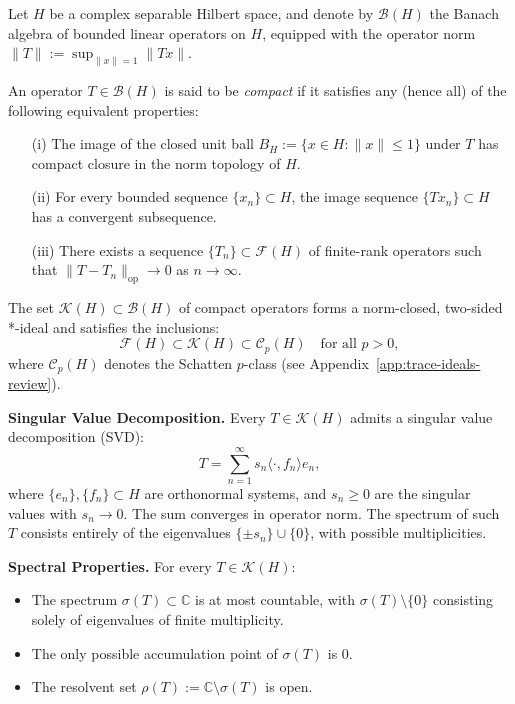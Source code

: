 \begin{definition}\label{def:compact-operator}
Let \( H \) be a complex separable Hilbert space, and denote by \( \mathcal{B}(H) \) the Banach algebra of bounded linear operators on \( H \), equipped with the operator norm \( \|T\| := \sup_{\|x\|=1} \|Tx\| \).

An operator \( T \in \mathcal{B}(H) \) is said to be \emph{compact} if it satisfies any (hence all) of the following equivalent properties:
\begin{enumerate}
    \item[\textup{(i)}] The image of the closed unit ball \( B_H := \{ x \in H : \|x\| \leq 1 \} \) under \( T \) has compact closure in the norm topology of \( H \).
    \item[\textup{(ii)}] For every bounded sequence \( \{x_n\} \subset H \), the image sequence \( \{Tx_n\} \subset H \) has a convergent subsequence.
    \item[\textup{(iii)}] There exists a sequence \( \{T_n\} \subset \mathcal{F}(H) \) of finite-rank operators such that \( \|T - T_n\|_{\mathrm{op}} \to 0 \) as \( n \to \infty \).
\end{enumerate}

The set \( \mathcal{K}(H) \subset \mathcal{B}(H) \) of compact operators forms a norm-closed, two-sided *-ideal and satisfies the inclusions:
\[
\mathcal{F}(H) \subset \mathcal{K}(H) \subset \mathcal{C}_p(H) \quad \text{for all } p > 0,
\]
where \( \mathcal{C}_p(H) \) denotes the Schatten \( p \)-class (see Appendix~\ref{app:trace-ideals-review}).

\medskip
\noindent\textbf{Singular Value Decomposition.}
Every \( T \in \mathcal{K}(H) \) admits a singular value decomposition (SVD):
\[
T = \sum_{n=1}^\infty s_n \langle \cdot, f_n \rangle e_n,
\]
where \( \{e_n\}, \{f_n\} \subset H \) are orthonormal systems, and \( s_n \geq 0 \) are the singular values with \( s_n \to 0 \). The sum converges in operator norm. The spectrum of such \( T \) consists entirely of the eigenvalues \( \{\pm s_n\} \cup \{0\} \), with possible multiplicities.

\medskip
\noindent\textbf{Spectral Properties.}
For every \( T \in \mathcal{K}(H) \):
\begin{itemize}
    \item The spectrum \( \sigma(T) \subset \mathbb{C} \) is at most countable, with \( \sigma(T) \setminus \{0\} \) consisting solely of eigenvalues of finite multiplicity.
    \item The only possible accumulation point of \( \sigma(T) \) is \( 0 \).
    \item The resolvent set \( \rho(T) := \mathbb{C} \setminus \sigma(T) \) is open.
\end{itemize}


\end{definition}
